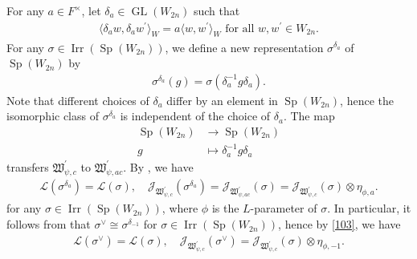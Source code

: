\documentclass[article]{article}
\numberwithin{equation}{section}
\theoremstyle{definition}
\DeclareMathOperator{\im}{Im}
\DeclareMathOperator{\GL}{GL}
\DeclareMathOperator{\SP}{Sp}
\DeclareMathOperator{\Irr}{Irr}
\begin{document}



 
For any $a\in F^\times$, let $\delta_a\in \GL(W_{2n})$ such that 
\begin{align}\label{112}
\langle \delta_a w, \delta_a w^\prime\rangle_W=a \langle w,w^\prime\rangle_W \,\,\mbox{for all $w,w^\prime\in W_{2n}$}. 
\end{align}
For any $\sigma\in \Irr(\SP(W_{2n}))$, we define a new representation $\sigma^{\delta_a}$ of $\SP(W_{2n})$ by 
\begin{align}\label{113}
\sigma^{\delta_a}(g)=\sigma(\delta_a^{-1}g\delta_a). 
\end{align}
Note that different choices of $\delta_a$ differ by an element in $\SP(W_{2n})$, hence the isomorphic class of $\sigma^{\delta_a}$ is independent of the choice of $\delta_a$. The map  
\begin{align*}
\SP(W_{2n})&\rightarrow \SP(W_{2n})\\
g &\mapsto \delta_a^{-1}g\delta_a
\end{align*}
transfers $\mathfrak W^\prime_{\psi,c}$ to $\mathfrak W^\prime_{\psi,ac}$. By \cite[Theorem 4.3]{MR3194648}, we have 
\begin{align}\label{103}
\mathcal L(\sigma^{\delta_a})=\mathcal L(\sigma),\quad \mathcal J_{\mathfrak W^\prime_{\psi,c}}(\sigma^{\delta_a})=\mathcal J_{\mathfrak W^\prime_{\psi,ac}}(\sigma)=\mathcal J_{\mathfrak W^\prime_{\psi,c}}(\sigma)\otimes \eta_{\phi,a}. 
\end{align}
for any $\sigma \in \Irr(\SP(W_{2n}))$, where $\phi$ is the $L$-parameter of $\sigma$. In particular, it follows from \cite[Chapter 4. II.1]{MR1041060} that 
$\sigma^\vee\cong \sigma^{\delta_{-1}}$ for $\sigma\in \Irr(\SP(W_{2n}))$, hence by \ref{103}, we have  
\begin{align}\label{104}
\mathcal L(\sigma^\vee)=\mathcal L(\sigma),\quad \mathcal J_{\mathfrak W^\prime_{\psi,c}}(\sigma^\vee)=\mathcal J_{\mathfrak W^\prime_{\psi,c}}(\sigma)\otimes \eta_{\phi,-1}. 
\end{align}
\end{document}
